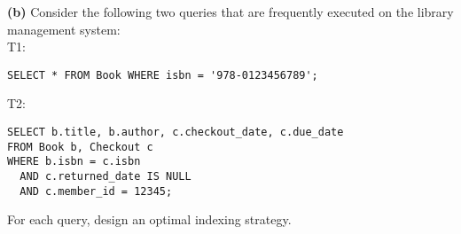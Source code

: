 \documentclass{article}
\begin{document}
\textbf{(b)} Consider the following two queries that are frequently executed on the 
library management system:\\

T1:
\begin{verbatim}
SELECT * FROM Book WHERE isbn = '978-0123456789';
\end{verbatim}

T2:
\begin{verbatim}
SELECT b.title, b.author, c.checkout_date, c.due_date
FROM Book b, Checkout c
WHERE b.isbn = c.isbn 
  AND c.returned_date IS NULL
  AND c.member_id = 12345;
\end{verbatim}

For each query, design an optimal indexing strategy.
\end{document}
